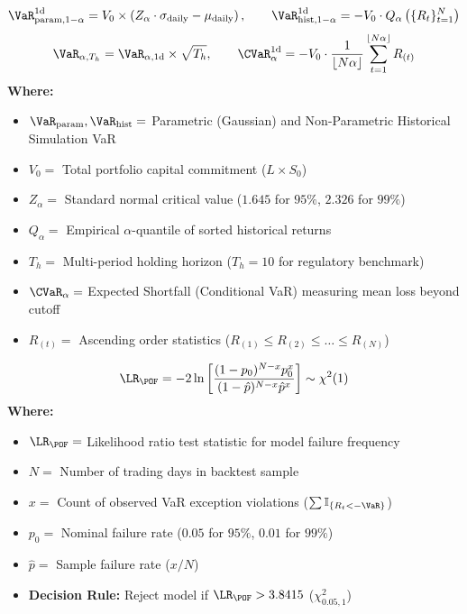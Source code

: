 \begin{formulabox}
\begin{equation*}
\VaR_{\text{param}, 1-\alpha}^{1\text{d}} = V_0 \times \left(Z_{\alpha} \cdot \sigma_{\text{daily}} - \mu_{\text{daily}}\right), \qquad \VaR_{\text{hist}, 1-\alpha}^{1\text{d}} = - V_0 \cdot Q_{\alpha}\left(\{R_t\}_{t=1}^N\right)
\end{equation*}
\begin{equation*}
\VaR_{\alpha, T_h} = \VaR_{\alpha, 1\text{d}} \times \sqrt{T_h}, \qquad \CVaR_{\alpha}^{1\text{d}} = - V_0 \cdot \frac{1}{\lfloor N \alpha \rfloor}\sum_{t=1}^{\lfloor N \alpha \rfloor} R_{(t)}
\end{equation*}
\textbf{Where:}
\begin{itemize}[leftmargin=1.8em, noitemsep]
    \item $\VaR_{\text{param}}, \VaR_{\text{hist}} =$ Parametric (Gaussian) and Non-Parametric Historical Simulation VaR
    \item $V_0 =$ Total portfolio capital commitment ($L \times S_0$)
    \item $Z_{\alpha} =$ Standard normal critical value ($1.645$ for $95\%$, $2.326$ for $99\%$)
    \item $Q_{\alpha} =$ Empirical $\alpha$-quantile of sorted historical returns
    \item $T_h =$ Multi-period holding horizon ($T_h = 10$ for regulatory benchmark)
    \item $\CVaR_{\alpha} =$ Expected Shortfall (Conditional VaR) measuring mean loss beyond cutoff
    \item $R_{(t)} =$ Ascending order statistics ($R_{(1)} \le R_{(2)} \le \dots \le R_{(N)}$)
\end{itemize}
\end{formulabox}

\begin{formulabox}
\begin{equation*}
\LR_{\POF} = -2 \ln \left[ \frac{(1 - p_0)^{N - x} p_0^x}{(1 - \hat{p})^{N - x} \hat{p}^x} \right] \sim \chi^2(1)
\end{equation*}
\textbf{Where:}
\begin{itemize}[leftmargin=1.8em, noitemsep]
    \item $\LR_{\POF} =$ Likelihood ratio test statistic for model failure frequency
    \item $N =$ Number of trading days in backtest sample
    \item $x =$ Count of observed VaR exception violations ($\sum \mathbb{I}_{\{R_t < -\VaR\}}$)
    \item $p_0 =$ Nominal failure rate ($0.05$ for $95\%$, $0.01$ for $99\%$)
    \item $\hat{p} =$ Sample failure rate ($x / N$)
    \item \textbf{Decision Rule:} Reject model if $\LR_{\POF} > 3.8415$ ($\chi^2_{0.05, 1}$)
\end{itemize}
\end{formulabox}

